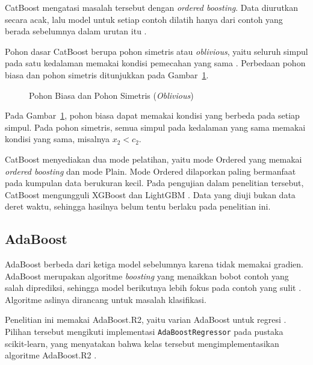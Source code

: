 CatBoost mengatasi masalah tersebut dengan \textit{ordered boosting}. Data
diurutkan secara acak, lalu model untuk setiap contoh dilatih hanya dari
contoh yang berada sebelumnya dalam urutan itu \cite{prokhorenkova2018}.

Pohon dasar CatBoost berupa pohon simetris atau \textit{oblivious}, yaitu
seluruh simpul pada satu kedalaman memakai kondisi pemecahan yang sama
\cite{prokhorenkova2018}. Perbedaan pohon biasa dan pohon simetris ditunjukkan pada Gambar~\ref{fig:pohon-simetris}.

\begin{figure}[!htbp]
  \centering
  \caption[Pohon Biasa dan Pohon Simetris (\textit{Oblivious})]{Pohon Biasa dan
    Pohon Simetris (\textit{Oblivious}) \cite{prokhorenkova2018}}
  \label{fig:pohon-simetris}
\end{figure}
Pada Gambar~\ref{fig:pohon-simetris}, pohon biasa dapat memakai kondisi yang
berbeda pada setiap simpul. Pada pohon simetris, semua simpul pada kedalaman
yang sama memakai kondisi yang sama, misalnya $x_2 < c_2$.

CatBoost menyediakan dua mode pelatihan, yaitu mode Ordered yang memakai
\textit{ordered boosting} dan mode Plain. Mode Ordered dilaporkan paling
bermanfaat pada kumpulan data berukuran kecil. Pada pengujian dalam penelitian tersebut, CatBoost mengungguli XGBoost dan LightGBM \cite{prokhorenkova2018}. Data yang diuji bukan data deret waktu, sehingga hasilnya belum tentu berlaku pada penelitian ini.

\subsection{AdaBoost}
AdaBoost berbeda dari ketiga model sebelumnya karena tidak memakai gradien.
AdaBoost merupakan algoritme \textit{boosting} yang menaikkan bobot contoh
yang salah diprediksi, sehingga model berikutnya lebih fokus pada contoh yang sulit
\cite{freund1997}. Algoritme aslinya dirancang untuk masalah klasifikasi.

Penelitian ini memakai AdaBoost.R2, yaitu varian AdaBoost untuk regresi
\cite{drucker1997}. Pilihan tersebut mengikuti implementasi
\texttt{AdaBoostRegressor} pada pustaka scikit-learn, yang menyatakan bahwa
kelas tersebut mengimplementasikan algoritme AdaBoost.R2
\cite{sklearnadaboost}.

